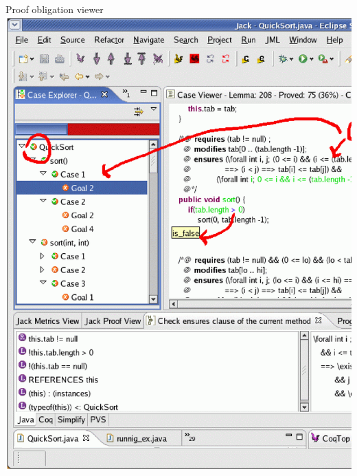 \documentclass[final,nocolorBG,a4,mobius,nototal,pdf,slideColor]{prosper}
\begin{document}
\begin{slide}{Proof obligation viewer}
\vspace*{-1.5em}
\includegraphics[height=\textheight]{screen3.ps}
\end{slide}
\end{document}
